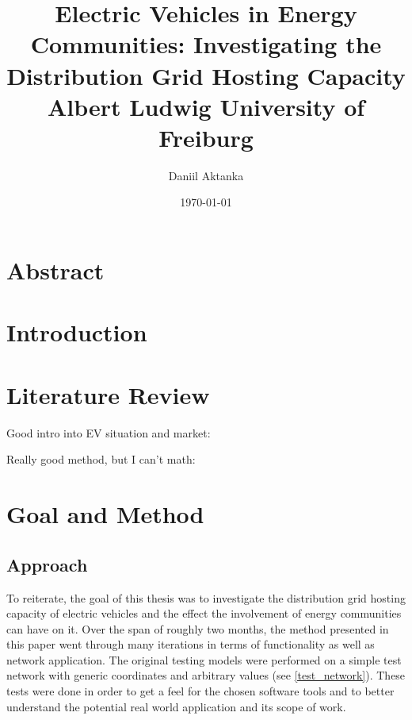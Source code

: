\documentclass[a4paper,10pt]{report}
\begin{document}
\title{
	\vspace{2cm}
	{\LARGE Electric Vehicles in Energy Communities:}
	{\Large Investigating the Distribution Grid Hosting Capacity} \\[2cm]
	{\large Albert Ludwig University of Freiburg}
}
\author{
	\Large Daniil Aktanka
}
\date{
	\normalsize \today
}
\maketitle
\thispagestyle{empty}


\chapter*{Abstract}


\tableofcontents
\cleardoublepage
{}


\chapter{Introduction}
\chapter{Literature Review}
Good intro into EV situation and market: \cite{Das2020}

Really good method, but I can't math: \cite{Gruosso2019}

\chapter{Goal and Method}
\section{Approach}\label{section_approach}
To reiterate, the goal of this thesis was to investigate the distribution grid hosting capacity of electric vehicles and the effect the involvement of energy communities can have on it. Over the span of roughly two months, the method presented in this paper went through many iterations in terms of functionality as well as network application. The original testing models were performed on a simple test network with generic coordinates and arbitrary values (see \cref{test_network}). These tests were done in order to get a feel for the chosen software tools and to better understand the potential real world application and its scope of work.
\end{document}
